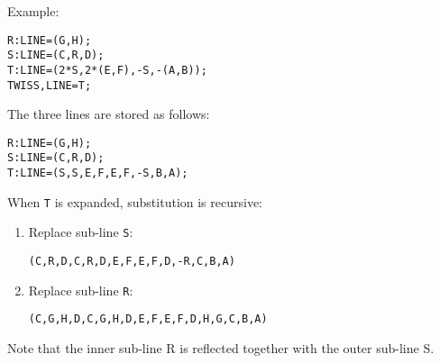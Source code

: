 Example:
\begin{verbatim}
R:LINE=(G,H);
S:LINE=(C,R,D);
T:LINE=(2*S,2*(E,F),-S,-(A,B));
TWISS,LINE=T;
\end{verbatim}
The three lines are stored as follows:
\begin{verbatim}
R:LINE=(G,H);
S:LINE=(C,R,D);
T:LINE=(S,S,E,F,E,F,-S,B,A);
\end{verbatim}
When \texttt{T} is expanded, substitution is recursive:
\begin{enumerate}
\item Replace sub-line \texttt{S}:
\begin{verbatim}
(C,R,D,C,R,D,E,F,E,F,D,-R,C,B,A)
\end{verbatim}
\item Replace sub-line \texttt{R}:
\begin{verbatim}
(C,G,H,D,C,G,H,D,E,F,E,F,D,H,G,C,B,A)
\end{verbatim}
\end{enumerate}
Note that the inner sub-line R is reflected together with
the outer sub-line S.

